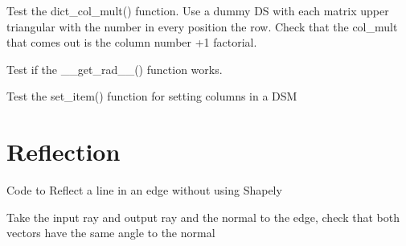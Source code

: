 \documentclass[letterpaper,10pt,english]{sphinxmanual}
\begin{document}

\begin{fulllineitems}
\label{index:DictionarySparseMatrix.test_20}
Test the dict\_col\_mult() function.
Use a dummy DS with each matrix upper triangular with the number in   every position the row.
Check that the col\_mult that comes out is the column number +1   factorial.

\end{fulllineitems}


\begin{fulllineitems}
\label{index:DictionarySparseMatrix.test_21}
Test if the \_\_get\_rad\_\_() function works.

\end{fulllineitems}


\begin{fulllineitems}
\label{index:DictionarySparseMatrix.test_22}
Test the set\_item() function for setting columns in a DSM

\end{fulllineitems}



\chapter{Reflection}
\label{index:module-reflection}\label{index:reflection}
Code to Reflect a line in an edge without using Shapely

\begin{fulllineitems}
\label{index:reflection.errorcheck}
Take the input ray and output ray and the normal to the edge,
check that both vectors have the same angle to the normal

\end{fulllineitems}

\end{document}
